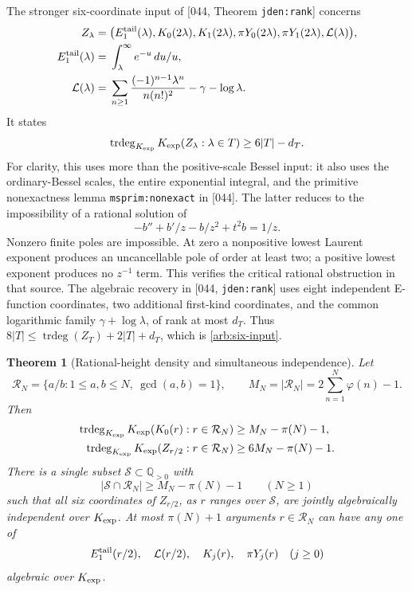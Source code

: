 \documentclass[11pt,a4paper]{article}
\newtheorem{theorem}{Theorem}[section]
\theoremstyle{definition}
\theoremstyle{remark}
\numberwithin{equation}{section}
\begin{document}
The stronger six-coordinate input of [044, Theorem
\texttt{jden:rank}] concerns
\begin{align*}
 Z_\lambda={}&\bigl(E_1^{\rm tail}(\lambda),
 K_0(2\lambda),K_1(2\lambda),
 \pi Y_0(2\lambda),\pi Y_1(2\lambda),\mathcal L(\lambda)\bigr),\\
 E_1^{\rm tail}(\lambda)={}&
     \int_\lambda^\infty e^{-u}\,du/u,\\
 \mathcal L(\lambda)={}&
     \sum_{n\geq1}\frac{(-1)^{n-1}\lambda^n}{n(n!)^2}
          -\gamma-\log\lambda.
\end{align*}
It states
\begin{equation}\label{arb:six-input}
 \operatorname{trdeg}_{K_{\mathrm{exp}}}
   K_{\mathrm{exp}}(Z_\lambda:\lambda\in T)\geq 6|T|-d_T.
\end{equation}
For clarity, this uses more than the positive-scale Bessel input:
it also uses the ordinary-Bessel scales, the entire exponential
integral, and the primitive nonexactness lemma
\texttt{msprim:nonexact} in [044].  The latter reduces to the impossibility
of a rational solution of
\[
 -b''+b'/z-b/z^2+t^2b=1/z.
\]
Nonzero finite poles are impossible.  At zero a nonpositive lowest
Laurent exponent produces an uncancellable pole of order at least
two; a positive lowest exponent produces no \(z^{-1}\) term.
This verifies the critical rational obstruction in that source.
The algebraic recovery in [044, \texttt{jden:rank}] uses eight
independent E-function coordinates, two additional first-kind
coordinates, and the common logarithmic family
\(\gamma+\log\lambda\), of rank at most \(d_T\).
Thus \(8|T|\leq \operatorname{trdeg}(Z_T)+2|T|+d_T\),
which is \eqref{arb:six-input}.

\begin{theorem}[Rational-height density and simultaneous independence]
\label{arb:rationalheight}
Let
\[
 \mathcal R_N=\{a/b:1\leq a,b\leq N,\ \gcd(a,b)=1\},
 \qquad M_N=|\mathcal R_N|=2\sum_{n=1}^N\varphi(n)-1.
\]
Then
\begin{align}
 \operatorname{trdeg}_{K_{\mathrm{exp}}}
    K_{\mathrm{exp}}(K_0(r):r\in\mathcal R_N)
       &\geq M_N-\pi(N)-1,\label{arb:rationalK}\\
 \operatorname{trdeg}_{K_{\mathrm{exp}}}
    K_{\mathrm{exp}}(Z_{r/2}:r\in\mathcal R_N)
       &\geq 6M_N-\pi(N)-1.\label{arb:rational6}
\end{align}
There is a single subset \(\mathcal S\subset\mathbb Q_{>0}\)
with
\[
 |\mathcal S\cap\mathcal R_N|\geq M_N-\pi(N)-1
 \qquad(N\geq1)
\]
such that all six coordinates of \(Z_{r/2}\), as
\(r\) ranges over \(\mathcal S\), are jointly algebraically
independent over \(K_{\mathrm{exp}}\).
At most \(\pi(N)+1\) arguments \(r\in\mathcal R_N\) can have
any one of
\[
 E_1^{\rm tail}(r/2),\quad \mathcal L(r/2),\quad
 K_j(r),\quad \pi Y_j(r)\quad(j\geq0)
\]
algebraic over \(K_{\mathrm{exp}}\).
\end{theorem}
\end{document}
